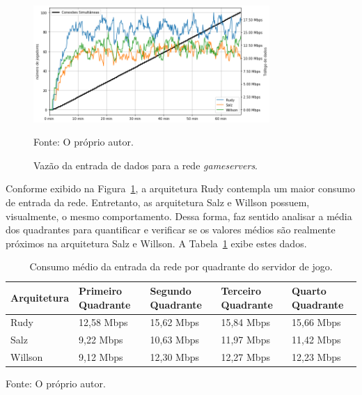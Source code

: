 \begin{figure}[htb!]
  \caption{Vazão da entrada de dados para a rede \textit{gameservers}.}
  \label{fig:net_in_gs}
  \includegraphics[width=0.8\textwidth]{figuras/analise/net_in_gs.png}
  \centering

  Fonte: O próprio autor.
\end{figure}

Conforme exibido na Figura~\ref{fig:net_in_gs}, a arquitetura Rudy contempla um maior consumo de entrada da rede.
%
Entretanto, as arquitetura Salz e Willson possuem, visualmente, o mesmo comportamento.
%
Dessa forma, faz sentido analisar a média dos quadrantes para quantificar e verificar se os valores médios são realmente próximos na arquitetura Salz e Willson.
%
A Tabela~\ref{tab:net_in_gs_media_quadrantes} exibe estes dados.

\begin{table}[htb!]
\centering
\begin{adjustbox}{max width=\textwidth}
\caption{Consumo médio da entrada da rede por quadrante do servidor de jogo.}
\label{tab:net_in_gs_media_quadrantes}

\begin{tabular}{l|l|l|l|l}
\hline \hline
Arquitetura & Primeiro Quadrante & Segundo Quadrante & Terceiro Quadrante & Quarto Quadrante \\ \hline \hline
Rudy        & 12,58 Mbps            & 15,62 Mbps           & 15,84 Mbps            & 15,66 Mbps          \\ \hline
Salz        & 9,22 Mbps            & 10,63 Mbps           & 11,97 Mbps            & 11,42 Mbps          \\ \hline
Willson     & 9,12 Mbps            & 12,30 Mbps          & 12,27 Mbps            & 12,23 Mbps          \\ \hline \hline
\end{tabular}
\end{adjustbox}

Fonte: O próprio autor.
\end{table}


